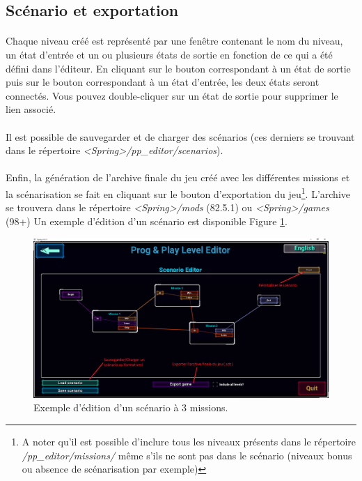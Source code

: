 \documentclass[a4paper]{article}
\begin{document}
\subsection{Scénario et exportation}\label{scenario-editor}
\paragraph{ }
Chaque niveau créé est représenté par une fenêtre contenant le nom du niveau, un état d'entrée et un ou plusieurs états de sortie en fonction de ce qui a été défini dans l'éditeur. En cliquant sur le bouton correspondant à un état de sortie puis sur le bouton correspondant à un état d'entrée, les deux états seront connectés. Vous pouvez double-cliquer sur un état de sortie pour supprimer le lien associé.
\paragraph{ }
Il est possible de sauvegarder et de charger des scénarios (ces derniers se trouvant dans le répertoire \textit{<Spring>/pp\_editor/scenarios}). 
\paragraph{ }
Enfin, la génération de l'archive finale du jeu créé avec les différentes missions et la scénarisation se fait en cliquant sur le bouton d'exportation du jeu\footnote{A noter qu'il est possible d'inclure tous les niveaux présents dans le répertoire \textit{/pp\_editor/missions/} même s'ils ne sont pas dans le scénario (niveaux bonus ou absence de scénarisation par exemple)}. L'archive se trouvera dans le répertoire \textit{<Spring>/mods} (82.5.1) ou \textit{<Spring>/games} (98+) Un exemple d'édition d'un scénario est disponible Figure \ref{fig:launcher-scenario}.
\begin{figure}[H]
\centering
\includegraphics[width=\linewidth]{launcher-scenario.png}
\caption{Exemple d'édition d'un scénario à 3 missions.}
\label{fig:launcher-scenario}
\end{figure}
\end{document}
